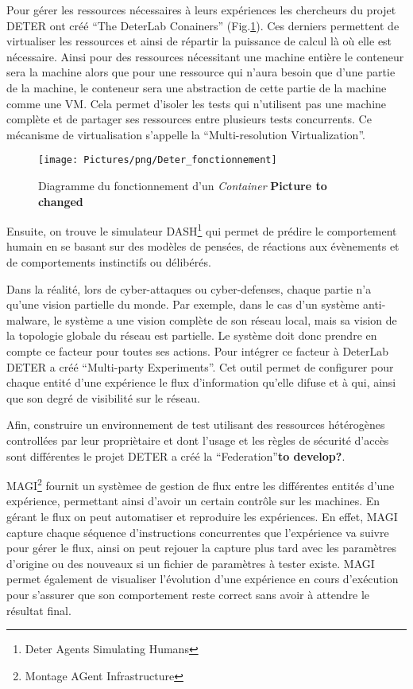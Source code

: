 Pour gérer les ressources nécessaires à leurs expériences les chercheurs du
projet DETER ont créé ``The DeterLab Conainers'' (Fig.\ref{Conteneur}). Ces
derniers permettent de virtualiser les ressources et ainsi de répartir la
puissance de calcul là où elle est nécessaire. Ainsi pour des ressources
nécessitant une machine entière le conteneur sera la machine alors que pour une
ressource qui n'aura besoin que d'une partie de la machine, le conteneur sera
une abstraction de cette partie de la machine comme une VM. Cela permet d'isoler
les tests qui n'utilisent pas une machine complète et de partager ses ressources
entre plusieurs tests concurrents. Ce mécanisme de virtualisation s'appelle la
``Multi-resolution Virtualization''.

\begin{figure}
  \centering \texttt{[image: Pictures/png/Deter\_fonctionnement]}
  \caption{Diagramme du fonctionnement d'un \textit{Container} \textbf{Picture
      to changed}}
  \label{Conteneur}
\end{figure}

Ensuite, on trouve le simulateur DASH\footnote{Deter Agents
  Simulating Humans} qui permet de prédire le comportement humain en se basant
sur des modèles de pensées, de réactions aux évènements et de comportements
instinctifs ou délibérés.

Dans la réalité, lors de cyber-attaques ou cyber-defenses, chaque partie n'a qu'une
vision partielle du monde. Par exemple, dans le cas d'un système anti-malware, le
système a une vision complète de son réseau local, mais sa vision de la
topologie globale du réseau est partielle. Le système doit donc prendre
en compte ce facteur pour toutes ses actions. Pour intégrer ce facteur à
DeterLab DETER a créé ``Multi-party Experiments''. Cet outil permet de
configurer pour chaque entité d'une expérience le flux d'information qu'elle
difuse et à qui, ainsi que son degré de visibilité sur le réseau.

Afin, construire un environnement de test utilisant des ressources hétérogènes
controllées par leur propriètaire et dont l'usage et les règles de sécurité
d'accès sont différentes le projet DETER a créé la
``Federation''\citep{DETER_faber2007deter}\textbf{to develop?}.

MAGI\footnote{Montage AGent Infrastructure} fournit un systèmee de gestion de
flux entre les différentes entités d'une expérience, permettant ainsi d'avoir un
certain contrôle sur les machines. En gérant le flux on peut automatiser et
reproduire les expériences. En effet, MAGI capture chaque séquence
d'instructions concurrentes que l'expérience va suivre pour gérer le flux, ainsi
on peut rejouer la capture plus tard avec les paramètres d'origine ou des
nouveaux si un fichier de paramètres à tester existe. MAGI permet également de
visualiser l'évolution d'une expérience en cours d'exécution pour s'assurer que
son comportement reste correct sans avoir à attendre le résultat final.

